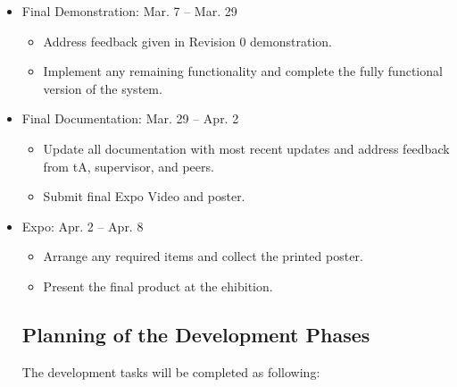 \documentclass[12pt]{article}
\begin{document}
\begin{itemize}
  \item Final Demonstration: Mar. 7 -- Mar. 29 
  \begin{itemize}
    \item Address feedback given in Revision 0 demonstration.
    \item Implement any remaining functionality and complete the fully functional version of the system.
  \end{itemize}

  \item Final Documentation: Mar. 29 -- Apr. 2 
  \begin{itemize}
    \item Update all documentation with most recent updates and address feedback from tA, supervisor, and peers.
    \item Submit final Expo Video and poster.
  \end{itemize}

  \item Expo: Apr. 2 -- Apr. 8 
  \begin{itemize}
    \item Arrange any required items and collect the printed poster. 
    \item Present the final product at the ehibition.
  \end{itemize}

\subsection{Planning of the Development Phases}

The development tasks will be completed as following: 


\end{itemize}
\end{document}
